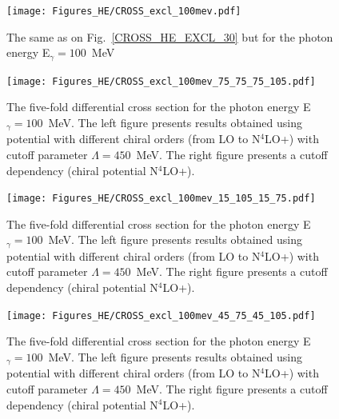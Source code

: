         \begin{figure}[h]
            \begin{center}
            \texttt{[image: Figures\_HE/CROSS\_excl\_100mev.pdf]}
            \end{center}
            \caption{The same as on Fig.~\ref{CROSS_HE_EXCL_30} but 
            for the photon energy E$_\gamma=100$~MeV}
            \label{CROSS_HE_EXCL_100}
        \end{figure}

        \begin{figure}[h]
            \begin{center}
                \texttt{[image: Figures\_HE/CROSS\_excl\_100mev\_75\_75\_75\_105.pdf]}
                \end{center}
                \caption{The five-fold differential cross section for the photon 
                energy E$_\gamma=100$~MeV.
                The left figure presents results obtained using potential
                with different chiral orders (from LO to N$^4$LO+) with cutoff parameter $\Lambda=450$~MeV.
                The right figure presents a cutoff dependency (chiral potential N$^4$LO+).}
                \label{CROSS_HE_EXCL_75_75_75_105}
        \end{figure}

        \begin{figure}[h]
            \begin{center}
                \texttt{[image: Figures\_HE/CROSS\_excl\_100mev\_15\_105\_15\_75.pdf]}
                \end{center}
                \caption{The five-fold differential cross section for the photon 
                energy E$_\gamma=100$~MeV.
                The left figure presents results obtained using potential
                with different chiral orders (from LO to N$^4$LO+) with cutoff parameter $\Lambda=450$~MeV.
                The right figure presents a cutoff dependency (chiral potential N$^4$LO+).}
                \label{CROSS_HE_EXCL_15_105_15_75}
        \end{figure}

        \begin{figure}[h]
            \begin{center}
                \texttt{[image: Figures\_HE/CROSS\_excl\_100mev\_45\_75\_45\_105.pdf]}
                \end{center}
                \caption{The five-fold differential cross section for the photon 
                energy E$_\gamma=100$~MeV.
                The left figure presents results obtained using potential
                with different chiral orders (from LO to N$^4$LO+) with cutoff parameter $\Lambda=450$~MeV.
                The right figure presents a cutoff dependency (chiral potential N$^4$LO+).}
                \label{CROSS_HE_EXCL_45_75_45_105}
        \end{figure}

